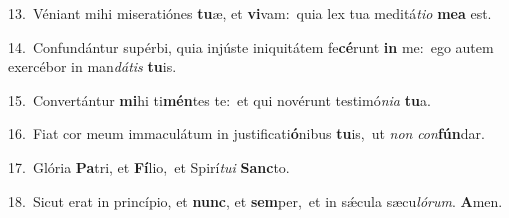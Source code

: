 {\numbfont\textcolor{\numbcolor}{13.}}~Véniant mihi miseratiónes \textbf{tu}\-æ, et \textbf{vi}\-vam:~\star quia lex tua meditá\-\textit{ti}\-\textit{o} \textbf{me}\-\textbf{a} est.\par
{\numbfont\textcolor{\numbcolor}{14.}}~Confundántur supérbi, quia injúste iniquitátem fe\-\textbf{cé}\-runt \textbf{in} me:~\star ego autem exercébor in man\-\textit{dá}\-\textit{tis} \textbf{tu}\-is.\par
{\numbfont\textcolor{\numbcolor}{15.}}~Convertántur \textbf{mi}\-hi ti\-\textbf{mén}\-tes te:~\star et qui novérunt testimó\-\textit{ni}\-\textit{a} \textbf{tu}\-a.\par
{\numbfont\textcolor{\numbcolor}{16.}}~Fiat cor meum immaculátum in justificati\-\textbf{ó}\-nibus \textbf{tu}\-is,~\star ut \textit{non} \textit{con}\-\textbf{fún}dar.\par
{\numbfont\textcolor{\numbcolor}{17.}}~Glória \textbf{Pa}\-tri, et \textbf{Fí}\-lio,~\star et Spirí\-\textit{tu}\-\textit{i} \textbf{Sanc}\-to.\par
{\numbfont\textcolor{\numbcolor}{18.}}~Sicut erat in princípio, et \textbf{nunc}\-, et \textbf{sem}\-per,~\star et in sǽcula sæcu\-\textit{ló}\-\textit{rum}. \textbf{A}\-men.\par
